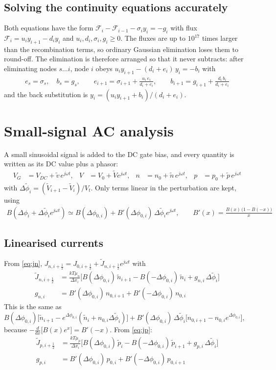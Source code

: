 \documentclass[11pt]{article}
\newcommand{\dphi}[1]{\Delta\phi_{#1}}
\newcommand{\half}{\tfrac{1}{2}}
\begin{document}
\subsection{Solving the continuity equations accurately}
Both equations have the form
$\mathcal F_i-\mathcal F_{i-1}-\sigma_iy_i=-g_i$ with flux $\mathcal F_i=u_iy_{i+1}-d_iy_i$ and
$u_i,d_i,\sigma_i,g_i\ge0$. The fluxes are up to $10^{17}$ times larger than the recombination terms, so
ordinary Gaussian elimination loses them to round-off. The elimination is therefore arranged so that it
never subtracts: after eliminating nodes $s\dots i$, node $i$ obeys $u_iy_{i+1}-(d_i+e_i)\,y_i=-b_i$ with
\begin{align}
e_s=\sigma_s,\quad b_s=g_s,\qquad
e_{i+1}=\sigma_{i+1}+\frac{u_i\,e_i}{d_i+e_i},\qquad b_{i+1}=g_{i+1}+\frac{d_i\,b_i}{d_i+e_i}
\end{align}
and the back substitution is $y_i=\left(u_iy_{i+1}+b_i\right)/\left(d_i+e_i\right)$.

\section{Small-signal AC analysis}
A small sinusoidal signal is added to the DC gate bias, and every quantity is written as its DC value plus a
phasor:
\begin{align}
V_G&=V_{DC}+\tilde v\,e^{j\omega t}, & V&=V_0+\tilde V e^{j\omega t}, &
n&=n_0+\tilde n\,e^{j\omega t}, & p&=p_0+\tilde p\,e^{j\omega t}
\end{align}
with $\Delta\tilde\phi_i=(\tilde V_{i+1}-\tilde V_i)/V_t$. Only terms linear in the perturbation are kept,
using
\begin{align}
B(\dphi{i}+\Delta\tilde\phi_ie^{j\omega t})\simeq B(\dphi{0,i})+B'(\dphi{0,i})\,\Delta\tilde\phi_ie^{j\omega t},
\qquad B'(x)=\frac{B(x)\,\big(1-B(-x)\big)}{x}
\end{align}

\subsection{Linearised currents}
From \eqref{eq:jn}, $J_{n,i+\half}=J_{0,i+\half}+\tilde J_{n,i+\half}e^{j\omega t}$ with
\begin{align}
\tilde J_{n,i+\half}&=\frac{kT\mu_n}{\Delta x_i}\Big[B(\dphi{0,i})\,\tilde n_{i+1}-B(-\dphi{0,i})\,\tilde n_i
+g_{n,i}\,\Delta\tilde\phi_i\Big] \label{eq:jnac}\\
g_{n,i}&=B'(\dphi{0,i})\,n_{0,i+1}+B'(-\dphi{0,i})\,n_{0,i}
\end{align}
This is the same as
$B(\dphi{0,i})\big[\tilde n_{i+1}-e^{\dphi{0,i}}(\tilde n_i+n_{0,i}\Delta\tilde\phi_i)\big]
+B'(\dphi{0,i})\,\Delta\tilde\phi_i\big[n_{0,i+1}-n_{0,i}e^{\dphi{0,i}}\big]$,
because $-\frac{d}{dx}\big[B(x)e^{x}\big]=B'(-x)$. From \eqref{eq:jp}:
\begin{align}
\tilde J_{p,i+\half}&=\frac{kT\mu_p}{\Delta x_i}\Big[B(\dphi{0,i})\,\tilde p_i-B(-\dphi{0,i})\,\tilde p_{i+1}
+g_{p,i}\,\Delta\tilde\phi_i\Big] \label{eq:jpac}\\
g_{p,i}&=B'(\dphi{0,i})\,p_{0,i}+B'(-\dphi{0,i})\,p_{0,i+1}
\end{align}
\end{document}
